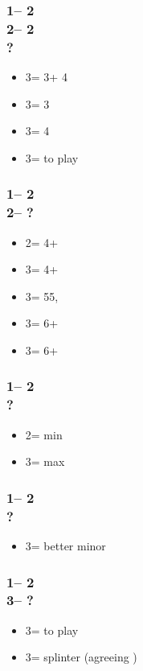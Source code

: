 \documentclass[12pt, a4paper]{article}
\begin{document}
\subsubsection*{1\nt -- 2\diams\\
                2\hearts -- 2\nt\\
                ?}
\begin{itemize}
    \item 3\clubs = 3\hearts + 4\clubs
    \item 3\diams = 3\hearts
    \item 3\hearts = 4\clubs
    \item 3\nt = to play
\end{itemize}

\subsubsection*{1\nt -- 2\hearts\\
                2\spades -- ?}
\begin{itemize}
    \item 2\nt = 4+\clubs \gf
    \item 3\clubs = 4+\diams \gf
    \item 3\diams = 55\major, \inv
    \item 3\hearts = 6+\spades \gf
    \item 3\spades = 6+\spades \inv
\end{itemize}

\subsubsection*{1\nt -- 2\spades\\
                ?}
\begin{itemize}
    \item 2\nt = min
    \item 3\clubs = max
\end{itemize}

\subsubsection*{1\nt -- 2\nt\\
                ?}
\begin{itemize}
    \item 3\minor = better minor
\end{itemize}

\subsubsection*{1\nt -- 2\nt\\
                3\minor -- ?}
\begin{itemize}
    \item 3\diams = to play
    \item 3\major = splinter (agreeing \diams)
\end{itemize}

\end{document}
